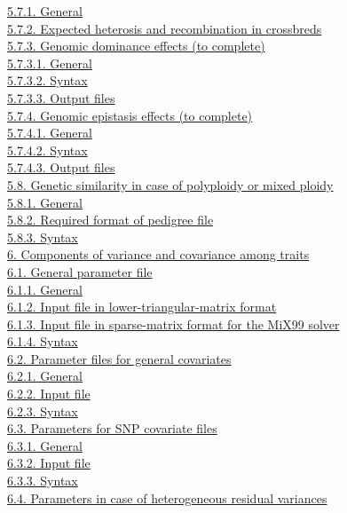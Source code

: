 \hyperref[Gene64]{5.7.1. General}\\
\hyperref[Gene65]{5.7.2. Expected heterosis and recombination in
crossbreds}\\
\hyperref[Gene66]{5.7.3. Genomic dominance effects (to complete)}\\
\hyperref[Gene67]{5.7.3.1. General}\\
\hyperref[Gene68]{5.7.3.2. Syntax}\\
\hyperref[Gene69]{5.7.3.3. Output files}\\
\hyperref[Gene70]{5.7.4. Genomic epistasis effects (to complete)}\\
\hyperref[Gene71]{5.7.4.1. General}\\
\hyperref[Gene72]{5.7.4.2. Syntax}\\
\hyperref[Gene73]{5.7.4.3. Output files}\\
\hyperref[Gene74]{5.8. Genetic similarity in case of polyploidy or mixed
ploidy}\\
\hyperref[Gene75]{5.8.1. General}\\
\hyperref[Gene76]{5.8.2. Required format of pedigree file}\\
\hyperref[Gene77]{5.8.3. Syntax}\\
\hyperref[Comp01]{6. Components of variance and covariance among
traits}\\
\hyperref[Comp02]{6.1. General parameter file}\\
\hyperref[Comp03]{6.1.1. General}\\
\hyperref[Comp04]{6.1.2. Input file in lower-triangular-matrix format}\\
\hyperref[Comp05]{6.1.3. Input file in sparse-matrix format for the
MiX99 solver}\\
\hyperref[Comp06]{6.1.4. Syntax}\\
\hyperref[Comp07]{6.2. Parameter files for general covariates}\\
\hyperref[Comp08]{6.2.1. General}\\
\hyperref[Comp09]{6.2.2. Input file}\\
\hyperref[Comp10]{6.2.3. Syntax}\\
\hyperref[Comp11]{6.3. Parameters for SNP covariate files}\\
\hyperref[Comp12]{6.3.1. General}\\
\hyperref[Comp13]{6.3.2. Input file}\\
\hyperref[Comp14]{6.3.3. Syntax}\\
\hyperref[Comp15]{6.4. Parameters in case of heterogeneous residual
variances}\\
